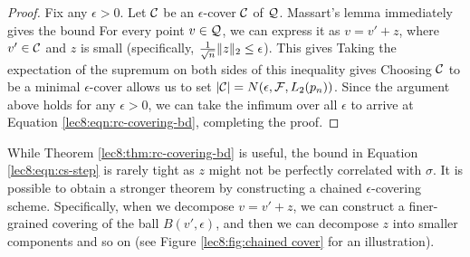 \begin{proof}
Fix any $\epsilon > 0$. Let $\mathcal C$ be an $\epsilon$-cover $\mathcal C$ of $\mathcal Q$. Massart's lemma immediately gives the bound
For every point $v\in \mathcal Q$, we can express it as $v=v'+z$, where $v'\in \mathcal C$ and $z$ is small (specifically, $\frac 1 {\sqrt{n}} \|z\|_2 \le \epsilon$). This gives
Taking the expectation of the supremum on both sides of this inequality gives
Choosing $\mathcal C$ to be a minimal $\epsilon$-cover allows us to set $|\mathcal C| = N(\epsilon, \mathcal F , L_2(p_n))$. Since the argument above holds for any $\epsilon > 0$, we can take the infimum over all $\epsilon$ to arrive at Equation \eqref{lec8:eqn:rc-covering-bd}, completing the proof.

\end{proof}


While Theorem \ref{lec8:thm:rc-covering-bd} is useful, the bound in Equation \eqref{lec8:eqn:cs-step} is rarely tight as $z$ might not be perfectly correlated with $\sigma$. It is possible to obtain a stronger theorem by constructing a chained $\epsilon$-covering scheme. Specifically, when we decompose $v=v'+z$, we can construct a finer-grained covering of the ball $B(v',\epsilon)$, and then we can decompose $z$ into smaller components and so on (see Figure \ref{lec8:fig:chained cover} for an illustration).


